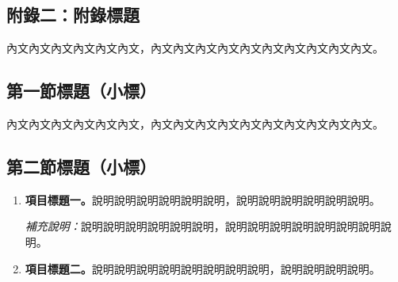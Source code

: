 \begin{ZhChapter}

\chapter*{附錄二：附錄標題}

內文內文內文內文內文內文，內文內文內文內文內文內文內文內文內文內文。

\section*{第一節標題（小標）}

內文內文內文內文內文內文，內文內文內文內文內文內文內文內文內文內文。

\section*{第二節標題（小標）}

\begin{enumerate}
\item \textbf{項目標題一。}說明說明說明說明說明說明，說明說明說明說明說明說明。

\textit{補充說明：}說明說明說明說明說明說明，說明說明說明說明說明說明說明說明。

\item \textbf{項目標題二。}說明說明說明說明說明說明說明說明，說明說明說明說明。
\end{enumerate}

\end{ZhChapter}